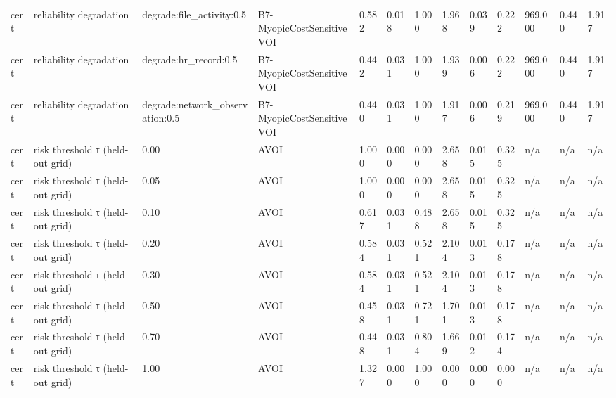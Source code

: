 \begin{table}[!ht]
{\begin{tabular}{lllllllllllll}
cert & reliability degradation & degrade:file\_activity:0.5 & B7-MyopicCostSensitiveVOI & 0.582 & 0.018 & 1.000 & 1.968 & 0.039 & 0.222 & 969.000 & 0.440 & 1.917 \\
cert & reliability degradation & degrade:hr\_record:0.5 & B7-MyopicCostSensitiveVOI & 0.442 & 0.031 & 1.000 & 1.939 & 0.006 & 0.222 & 969.000 & 0.440 & 1.917 \\
cert & reliability degradation & degrade:network\_observation:0.5 & B7-MyopicCostSensitiveVOI & 0.440 & 0.031 & 1.000 & 1.917 & 0.006 & 0.219 & 969.000 & 0.440 & 1.917 \\
cert & risk threshold τ (held-out grid) & 0.00 & AVOI & 1.000 & 0.000 & 0.000 & 2.658 & 0.015 & 0.325 & n/a & n/a & n/a \\
cert & risk threshold τ (held-out grid) & 0.05 & AVOI & 1.000 & 0.000 & 0.000 & 2.658 & 0.015 & 0.325 & n/a & n/a & n/a \\
cert & risk threshold τ (held-out grid) & 0.10 & AVOI & 0.617 & 0.031 & 0.488 & 2.658 & 0.015 & 0.325 & n/a & n/a & n/a \\
cert & risk threshold τ (held-out grid) & 0.20 & AVOI & 0.584 & 0.031 & 0.521 & 2.104 & 0.013 & 0.178 & n/a & n/a & n/a \\
cert & risk threshold τ (held-out grid) & 0.30 & AVOI & 0.584 & 0.031 & 0.521 & 2.104 & 0.013 & 0.178 & n/a & n/a & n/a \\
cert & risk threshold τ (held-out grid) & 0.50 & AVOI & 0.458 & 0.031 & 0.721 & 1.701 & 0.013 & 0.178 & n/a & n/a & n/a \\
cert & risk threshold τ (held-out grid) & 0.70 & AVOI & 0.448 & 0.031 & 0.804 & 1.669 & 0.012 & 0.174 & n/a & n/a & n/a \\
cert & risk threshold τ (held-out grid) & 1.00 & AVOI & 1.327 & 0.000 & 1.000 & 0.000 & 0.000 & 0.000 & n/a & n/a & n/a \\
\bottomrule
\end{tabular}}
\end{table}
